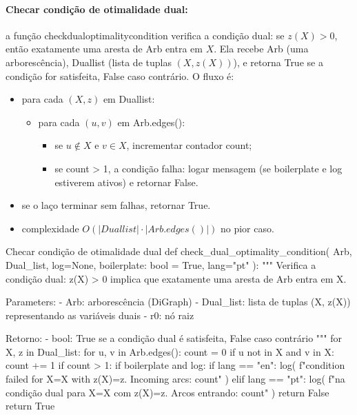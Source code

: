 \documentclass[12pt,a4paper]{article}
\def\texttt#1{#1}%
\def\_{}%
\begin{document}
\paragraph{Checar condição de otimalidade dual:}
a função \texttt{check\_dual\_optimality\_condition} verifica a condição dual: se \(z(X)>0\), então exatamente uma aresta de \texttt{Arb} entra em \(X\). Ela recebe \texttt{Arb} (uma arborescência), \texttt{Dual\_list} (lista de tuplas \((X,z(X))\)), e retorna True se a condição for satisfeita, False caso contrário. O fluxo é:
\begin{itemize}\setlength{\itemsep}{1pt}
    \item para cada \((X,z)\) em \texttt{Dual\_list}:
          \begin{itemize}\setlength{\itemsep}{1pt}
              \item para cada \((u,v)\) em \texttt{Arb.edges()}:
                    \begin{itemize}\setlength{\itemsep}{1pt}
                        \item se \(u\notin X\) e \(v\in X\), incrementar contador \texttt{count};
                        \item se \texttt{count > 1}, a condição falha: logar mensagem (se \texttt{boilerplate} e \texttt{log} estiverem ativos) e retornar False.
                    \end{itemize}
          \end{itemize}
    \item se o laço terminar sem falhas, retornar True.
    \item complexidade \(O(|\texttt{Dual\_list}| \cdot |\texttt{Arb.edges()}|)\) no pior caso.
\end{itemize}

\begin{pybox}{Checar condição de otimalidade dual}
def check_dual_optimality_condition(
    Arb, Dual_list, log=None, boilerplate: bool = True, lang="pt"
):
    """
    Verifica a condição dual: z(X) > 0 implica que exatamente uma aresta de Arb entra em X.

    Parameters:
        - Arb: arborescência (DiGraph)
        - Dual_list: lista de tuplas (X, z(X)) representando as variáveis duais
        - r0: nó raiz

    Retorno:
        - bool: True se a condição dual é satisfeita, False caso contrário
    """
    for X, z in Dual_list:
        for u, v in Arb.edges():
            count = 0
            if u not in X and v in X:
                count += 1
                if count > 1:
                    if boilerplate and log:
                        if lang == "en":
                            log(
                                f"\nDual condition failed for X={X} with z(X)={z}. Incoming arcs: {count}"
                            )
                        elif lang == "pt":
                            log(
                                f"\nFalha na condição dual para X={X} com z(X)={z}. Arcos entrando: {count}"
                            )
                    return False
    return True    

\end{pybox}
\end{document}
